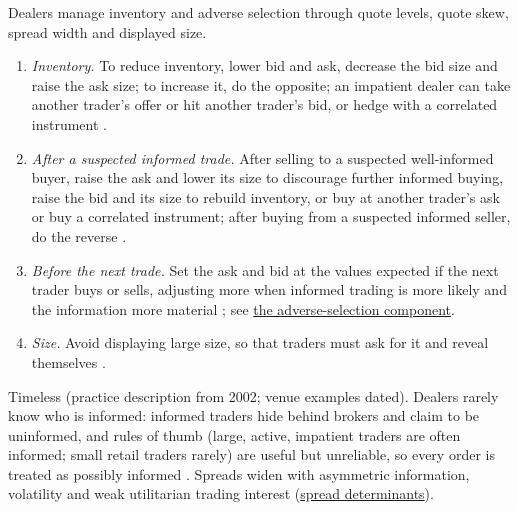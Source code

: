 \begin{qfmethod}\label{meth:dealer-quote-adjustment}
 Dealers manage inventory and adverse selection through quote levels, quote skew, spread width and displayed size.
\begin{enumerate}
\item \emph{Inventory.} To reduce inventory, lower bid and ask, decrease the bid size and raise the ask size; to increase it, do the opposite; an impatient dealer can take another trader's offer or hit another trader's bid, or hedge with a correlated instrument \citep[chap.~``Dealers'', pp.~284--285, Table~13-2]{alpha-harris}.
\item \emph{After a suspected informed trade.} After selling to a suspected well-informed buyer, raise the ask and lower its size to discourage further informed buying, raise the bid and its size to rebuild inventory, or buy at another trader's ask or buy a correlated instrument; after buying from a suspected informed seller, do the reverse \citep[same chap., pp.~287--288, Table~13-3]{alpha-harris}.
\item \emph{Before the next trade.} Set the ask and bid at the values expected if the next trader buys or sells, adjusting more when informed trading is more likely and the information more material \citep[same chap., pp.~288--290]{alpha-harris}; see \hyperref[res:adverse-selection-spread-component]{the adverse-selection component}.
\item \emph{Size.} Avoid displaying large size, so that traders must ask for it and reveal themselves \citep[same chap., p.~291]{alpha-harris}.
\end{enumerate}

 Timeless (practice description from 2002; venue examples dated). Dealers rarely know who is informed: informed traders hide behind brokers and claim to be uninformed, and rules of thumb (large, active, impatient traders are often informed; small retail traders rarely) are useful but unreliable, so every order is treated as possibly informed \citep[same chap., pp.~288--289]{alpha-harris}. Spreads widen with asymmetric information, volatility and weak utilitarian trading interest \citep[chap.~``Bid/Ask Spreads'', pp.~312--313]{alpha-harris} (\hyperref[res:spread-determinants]{spread determinants}).


\end{qfmethod}
